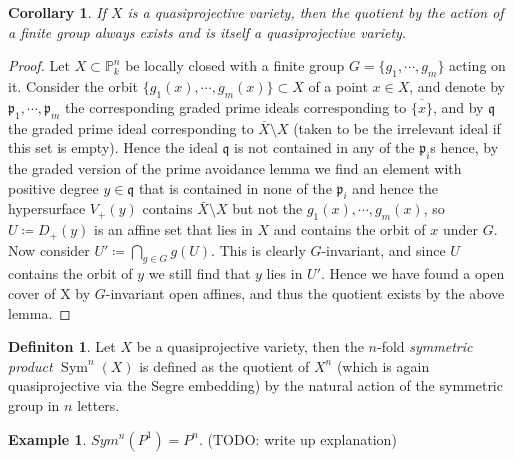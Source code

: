 \documentclass[11pt, a4paper, german]{article}
\theoremstyle{plain}
\newtheorem{corollary}[theorem]{Corollary}
\theoremstyle{definition}
\newtheorem{definition}[theorem]{Definiton}
\newtheorem{remark}[theorem]{Remark}
\newtheorem{example}[theorem]{Example}
\DeclareMathOperator{\Sym}{Sym}
\DeclareMathOperator{\Proj}{Proj}
\begin{document}
\begin{corollary}
    If $X$ is a quasiprojective variety, then the quotient by the action of a finite group always exists and is itself a quasiprojective variety.
\end{corollary}
\begin{proof}
    Let $X \subset \mathbb{P}_k^n$ be locally closed with a finite group $G = \{g_1,\cdots,g_m\}$ acting on it. 
    Consider the orbit $\{g_1(x),\cdots,g_m(x)\} \subset X$ of a point $x \in X$, and denote by $\mathfrak{p}_1,\cdots,\mathfrak{p}_m$ the 
    corresponding graded prime ideals corresponding to $\overline{\{x\}}$, and by $\mathfrak{q}$ the graded prime ideal corresponding to
    $\overline{X} \setminus X$ (taken to be the irrelevant ideal if this set is empty). 
    Hence the ideal $\mathfrak{q}$ is not contained in any of the $\mathfrak{p}_i$s hence, by the graded version of the prime
    avoidance lemma we find an element with positive degree $y \in \mathfrak{q}$ that is contained in none of the $\mathfrak{p}_i$ and hence
    the hypersurface $V_+(y)$ contains $\bar{X} \setminus X$ but not the $g_1(x),\cdots,g_m(x)$, so $U \coloneqq D_+(y)$ 
    is an affine set that lies in $X$ and contains the orbit of $x$ under $G$. Now consider $U' \coloneqq \bigcap_{g \in G} g(U)$. This is clearly
    $G$-invariant, and since $U$ contains the orbit of $y$ we still find that $y$ lies in $U'$. Hence we have found a open cover of X by
    $G$-invariant open affines, and thus the quotient exists by the above lemma.
\end{proof}


\begin{definition}
    \label{symdef}
    Let $X$ be a quasiprojective variety, then the $n$-fold \emph{symmetric product} $\Sym^n(X)$ is defined as the quotient of $X^n$
    (which is again quasiprojective via the Segre embedding) by the natural action of the symmetric group in $n$ letters.
\end{definition}

\begin{example}
    $Sym^n(P^1) = P^n$. (TODO: write up explanation)
\end{example}
\end{document}
